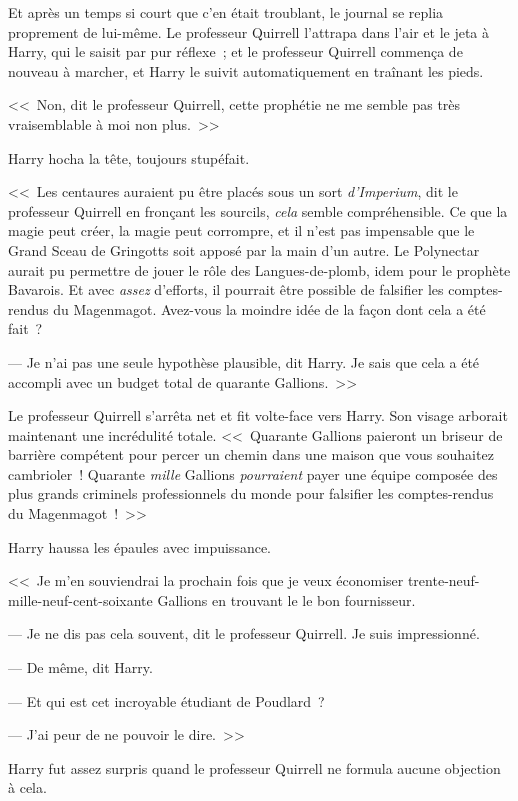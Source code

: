 Et après un temps si court que c'en était troublant, le journal se replia proprement de lui-même. Le professeur Quirrell l'attrapa dans l'air et le jeta à Harry, qui le saisit par pur réflexe~; et le professeur Quirrell commença de nouveau à marcher, et Harry le suivit automatiquement en traînant les pieds.

<<~Non, dit le professeur Quirrell, cette prophétie ne me semble pas très vraisemblable à moi non plus.~>>

Harry hocha la tête, toujours stupéfait.

<<~Les centaures auraient pu être placés sous un sort \emph{d'Imperium}, dit le professeur Quirrell en fronçant les sourcils, \emph{cela} semble compréhensible. Ce que la magie peut créer, la magie peut corrompre, et il n'est pas impensable que le Grand Sceau de Gringotts soit apposé par la main d'un autre. Le Polynectar aurait pu permettre de jouer le rôle des Langues-de-plomb, idem pour le prophète Bavarois. Et avec \emph{assez} d'efforts, il pourrait être possible de falsifier les comptes-rendus du Magenmagot. Avez-vous la moindre idée de la façon dont cela a été fait~?

--- Je n'ai pas une seule hypothèse plausible, dit Harry. Je sais que cela a été accompli avec un budget total de quarante Gallions.~>>

Le professeur Quirrell s'arrêta net et fit volte-face vers Harry. Son visage arborait maintenant une incrédulité totale. <<~Quarante Gallions paieront un briseur de barrière compétent pour percer un chemin dans une maison que vous souhaitez cambrioler~! Quarante \emph{mille} Gallions \emph{pourraient} payer une équipe composée des plus grands criminels professionnels du monde pour falsifier les comptes-rendus du Magenmagot~!~>>

Harry haussa les épaules avec impuissance.

<<~Je m'en souviendrai la prochain fois que je veux économiser trente-neuf-mille-neuf-cent-soixante Gallions en trouvant le le bon fournisseur.

--- Je ne dis pas cela souvent, dit le professeur Quirrell. Je suis impressionné.

--- De même, dit Harry.

--- Et qui est cet incroyable étudiant de Poudlard~?

--- J'ai peur de ne pouvoir le dire.~>>

Harry fut assez surpris quand le professeur Quirrell ne formula aucune objection à cela.

